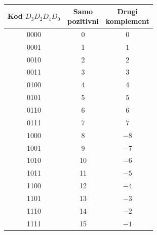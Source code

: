 \begin{tabular}{ccc}\toprule
\makecell{Kod\\$D_3 D_2 D_1 D_0$}&\makecell{Samo\\pozitivni}&\makecell{Drugi\\komplement}\\\midrule
0000&0&$0$\\
0001&1&$1$\\
0010&2&$2$\\
0011&3&$3$\\
0100&4&$4$\\
0101&5&$5$\\
0110&6&$6$\\
0111&7&$7$\\
\midrule
1000&8&$-8$\\
1001&9&$-7$\\
1010&10&$-6$\\
1011&11&$-5$\\
1100&12&$-4$\\
1101&13&$-3$\\
1110&14&$-2$\\
1111&15&$-1$\\
\bottomrule\end{tabular}
